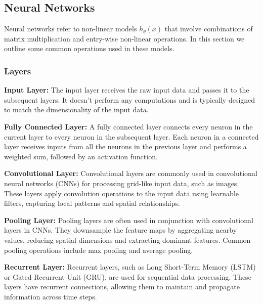 \subsection{Neural Networks}

Neural networks refer to non-linear models $h_{\theta}(x)$ that involve combinations of matrix multiplication and entry-wise non-linear operations. In this section we outline some common operations used in these models. 


\subsubsection{Layers}

\begin{example}
    \textbf{Input Layer:} The input layer receives the raw input data and passes it to the subsequent layers. It doesn't perform any computations and is typically designed to match the dimensionality of the input data.
\end{example}

\begin{example}
    \textbf{Fully Connected Layer:} A fully connected layer connects every neuron in the current layer to every neuron in the subsequent layer. Each neuron in a connected layer receives inputs from all the neurons in the previous layer and performs a weighted sum, followed by an activation function.
\end{example}

\begin{example}
    \textbf{Convolutional Layer:} Convolutional layers are commonly used in convolutional neural networks (CNNs) for processing grid-like input data, such as images. These layers apply convolution operations to the input data using learnable filters, capturing local patterns and spatial relationships.
\end{example}

\begin{example}
    \textbf{Pooling Layer:} Pooling layers are often used in conjunction with convolutional layers in CNNs. They downsample the feature maps by aggregating nearby values, reducing spatial dimensions and extracting dominant features. Common pooling operations include max pooling and average pooling.
\end{example}

\begin{example}
    \textbf{Recurrent Layer:} Recurrent layers, such as Long Short-Term Memory (LSTM) or Gated Recurrent Unit (GRU), are used for sequential data processing. These layers have recurrent connections, allowing them to maintain and propagate information across time steps.
\end{example}
    
